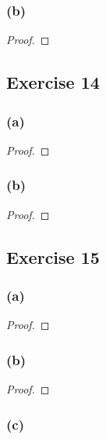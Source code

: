 \documentclass[14pt]{extarticle}
\begin{document}
\subsubsection{(b)}

\begin{proof}

\end{proof}

\subsection{Exercise 14}

\subsubsection{(a)}

\begin{proof}

\end{proof}

\subsubsection{(b)}

\begin{proof}

\end{proof}

\subsection{Exercise 15}

\subsubsection{(a)}

\begin{proof}

\end{proof}

\subsubsection{(b)}

\begin{proof}

\end{proof}

\subsubsection{(c)}
\end{document}
